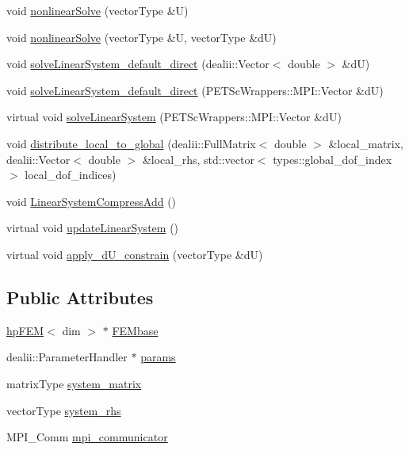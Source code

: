 \begin{DoxyCompactItemize}
\item 
void \mbox{\hyperlink{classsolve_class_aa848c866771bf63f69e8ff35d4c947aa}{nonlinear\+Solve}} (vector\+Type \&U)
\item 
void \mbox{\hyperlink{classsolve_class_a9240f8777a918e2c20e57857e4b6b97e}{nonlinear\+Solve}} (vector\+Type \&U, vector\+Type \&dU)
\item 
void \mbox{\hyperlink{classsolve_class_aaed39c6902f1e1de684583e56fb14f66}{solve\+Linear\+System\+\_\+default\+\_\+direct}} (dealii\+::\+Vector$<$ double $>$ \&dU)
\item 
void \mbox{\hyperlink{classsolve_class_ac888eaa37061db46d24d90065b733a82}{solve\+Linear\+System\+\_\+default\+\_\+direct}} (P\+E\+T\+Sc\+Wrappers\+::\+M\+P\+I\+::\+Vector \&dU)
\item 
virtual void \mbox{\hyperlink{classsolve_class_a31c22340527a596f8d6aeeea60ffe52a}{solve\+Linear\+System}} (P\+E\+T\+Sc\+Wrappers\+::\+M\+P\+I\+::\+Vector \&dU)
\item 
void \mbox{\hyperlink{classsolve_class_af9e8a3e1a38280c43f242bbeb7139f00}{distribute\+\_\+local\+\_\+to\+\_\+global}} (dealii\+::\+Full\+Matrix$<$ double $>$ \&local\+\_\+matrix, dealii\+::\+Vector$<$ double $>$ \&local\+\_\+rhs, std\+::vector$<$ types\+::global\+\_\+dof\+\_\+index $>$ local\+\_\+dof\+\_\+indices)
\item 
void \mbox{\hyperlink{classsolve_class_ad7659997bee5e782a6eaa46db001b66a}{Linear\+System\+Compress\+Add}} ()
\item 
virtual void \mbox{\hyperlink{classsolve_class_af78c2c6284234c93872188334fb997d8}{update\+Linear\+System}} ()
\item 
virtual void \mbox{\hyperlink{classsolve_class_a029ece57f667fa697cb29eb482eff31b}{apply\+\_\+d\+U\+\_\+constrain}} (vector\+Type \&dU)
\end{DoxyCompactItemize}
\subsection*{Public Attributes}
\begin{DoxyCompactItemize}
\item 
\mbox{\hyperlink{classhp_f_e_m}{hp\+F\+EM}}$<$ dim $>$ $\ast$ \mbox{\hyperlink{classsolve_class_a46118a342b07ce7167bb0c9358de84f1}{F\+E\+Mbase}}
\item 
dealii\+::\+Parameter\+Handler $\ast$ \mbox{\hyperlink{classsolve_class_accca5aede13ea52f0c11dff4daf1ad97}{params}}
\item 
matrix\+Type \mbox{\hyperlink{classsolve_class_a56f7357eb335f9ce4ac30bc30d7513e8}{system\+\_\+matrix}}
\item 
vector\+Type \mbox{\hyperlink{classsolve_class_a6c39fa839fdc40d2408946617a778571}{system\+\_\+rhs}}
\item 
M\+P\+I\+\_\+\+Comm \mbox{\hyperlink{classsolve_class_a03728ed636ca889ae407c84d181bc611}{mpi\+\_\+communicator}}
\end{DoxyCompactItemize}



